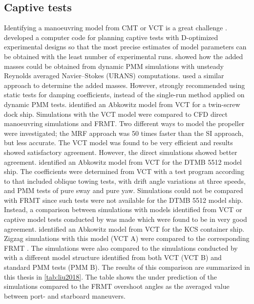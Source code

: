 \subsection{Captive tests} \label{sec:CT}
Identifying a manoeuvring model from CMT or VCT is a great challenge  \cite{sutuloAlgorithmOfflineIdentification2014}.
\textcite{sutuloSynthesisExperimentalDesigns2004} developed a computer code for planning captive tests with D-optimized experimental designs so that the most precise estimates of model parameters can be obtained with the least number of experimental runs.
\textcite{sakamotoURANSSimulationsStatic2012} showed how the added masses could be obtained from dynamic PMM simulations with unsteady Reynolds averaged Navier–Stokes (URANS) computations. \textcite{elmoctarRANSBasedSimulatedShip2014} used a similar approach to determine the added masses. 
However, \textcite{sakamotoURANSSimulationsStatic2012} strongly recommended using static tests for damping coefficients, instead of the single-run method applied on dynamic PMM tests.
\textcite{elmoctarRANSBasedSimulatedShip2014} identified an Abkowitz model from VCT for a twin-screw dock ship. Simulations with the VCT model were compared to CFD direct manoeuvring simulations and FRMT. Two different ways to model the propeller were investigated; the MRF approach was 50 times faster than the SI approach, but less accurate. The VCT model was found to be very efficient and results showed satisfactory agreement. However, the direct simulations showed better agreement.
\textcite{hajivandVirtualSimulationManeuvering2015} identified an Abkowitz model from VCT for the DTMB 5512 model ship. The coefficients were determined from VCT with a test program according to \textcite{yoonBenchmarkCFDValidation2015c} that included oblique towing tests, with drift angle variations at three speeds, and PMM tests of pure sway and pure yaw.
Simulations could not be compared with FRMT since such tests were not available for the DTMB 5512 model ship. 
Instead, a comparison between simulations with models identified from VCT or captive model tests conducted by \textcite{yoonBenchmarkCFDValidation2015c} was made which were found to be in very good agreement.
\textcite{liuPredictionsShipManeuverability2018} identified an Abkowitz model from VCT for the KCS container ship. Zigzag simulations with this model (VCT A) were compared to the corresponding FRMT \cite{simmanWorkshopVerificationValidation2014}. The simulations were also compared to the simulations conducted by \textcite{simonsenKCSPMMTests2014} with a different model structure identified from both VCT (VCT B) and standard PMM tests (PMM B). The results of this comparison are summarized in this thesis in \autoref{tab:liu2018}. The table shows the under prediction of the simulations compared to the FRMT overshoot angles as the averaged value between port- and starboard maneuvers. 
